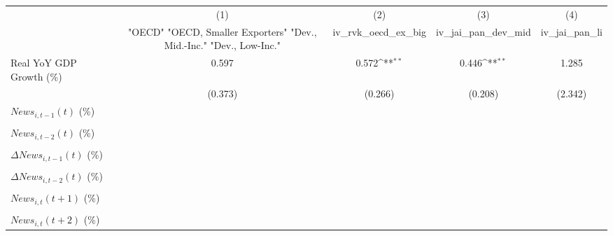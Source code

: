 {
\def\sym#1{\ifmmode^{#1}\else\(^{#1}\)\fi}
\begin{tabular}{l*{4}{c}}
\toprule
                    &\multicolumn{1}{c}{(1)}&\multicolumn{1}{c}{(2)}&\multicolumn{1}{c}{(3)}&\multicolumn{1}{c}{(4)}\\
                    &\multicolumn{1}{c}{ "OECD" "OECD, Smaller Exporters" "Dev., Mid.-Inc." "Dev., Low-Inc."}&\multicolumn{1}{c}{iv_rvk_oecd_ex_big}&\multicolumn{1}{c}{iv_jai_pan_dev_mid}&\multicolumn{1}{c}{iv_jai_pan_li}\\
\midrule
Real YoY GDP Growth (\%)&       0.597         &       0.572\sym{**} &       0.446\sym{**} &       1.285         \\
                    &     (0.373)         &     (0.266)         &     (0.208)         &     (2.342)         \\
\addlinespace
$ News_{i,t-1}(t)$ (\%)&                     &                     &                     &                     \\
                    &                     &                     &                     &                     \\
\addlinespace
$ News_{i,t-2}(t)$ (\%)&                     &                     &                     &                     \\
                    &                     &                     &                     &                     \\
\addlinespace
$ \Delta News_{i,t-1}(t)$ (\%)&                     &                     &                     &                     \\
                    &                     &                     &                     &                     \\
\addlinespace
$ \Delta News_{i,t-2}(t)$ (\%)&                     &                     &                     &                     \\
                    &                     &                     &                     &                     \\
\addlinespace
$ News_{i,t}(t+1)$ (\%)&                     &                     &                     &                     \\
                    &                     &                     &                     &                     \\
\addlinespace
$ News_{i,t}(t+2)$ (\%)&                     &                     &                     &                     \\

\end{tabular}}
